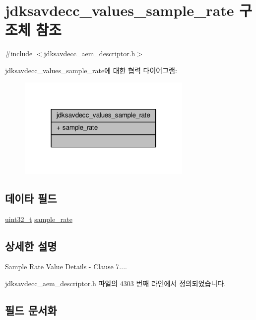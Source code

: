 \hypertarget{structjdksavdecc__values__sample__rate}{}\section{jdksavdecc\+\_\+values\+\_\+sample\+\_\+rate 구조체 참조}
\label{structjdksavdecc__values__sample__rate}


{\ttfamily \#include $<$jdksavdecc\+\_\+aem\+\_\+descriptor.\+h$>$}



jdksavdecc\+\_\+values\+\_\+sample\+\_\+rate에 대한 협력 다이어그램\+:
\nopagebreak
\begin{figure}[H]
\begin{center}
\leavevmode
\includegraphics[width=238pt]{structjdksavdecc__values__sample__rate__coll__graph}
\end{center}
\end{figure}
\subsection*{데이타 필드}
\begin{DoxyCompactItemize}
\item 
\hyperlink{parse_8c_a6eb1e68cc391dd753bc8ce896dbb8315}{uint32\+\_\+t} \hyperlink{structjdksavdecc__values__sample__rate_a2fba55d9442e7dba4623825cd737e520}{sample\+\_\+rate}
\end{DoxyCompactItemize}


\subsection{상세한 설명}
Sample Rate Value Details -\/ Clause 7.... 

jdksavdecc\+\_\+aem\+\_\+descriptor.\+h 파일의 4303 번째 라인에서 정의되었습니다.



\subsection{필드 문서화}
